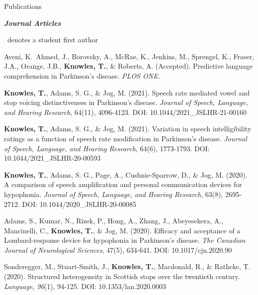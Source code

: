\documentclass{resume} %
\begin{document}

\begin{rSection}{Publications}

\begin{center}
	{\bf \emph{Journal Articles}}
\end{center}

\dagger\ denotes a student first author

\begin{etaremune}

	\item Aveni, K.\dagger\, Ahmed, J., Borovsky, A., McRae, K., Jenkins, M., Sprengel, K., Fraser, J.A., Orange, J.B., {\bf Knowles, T.}, \& Roberts, A. (Accepted). Predictive language comprehension in Parkinson’s disease. \emph{PLOS ONE.}

	\item {\bf Knowles, T.}, Adams, S. G., \& Jog, M. (2021). Speech rate mediated vowel and stop voicing distinctiveness in Parkinson's disease. \emph{Journal of Speech, Language, and Hearing Research}, 64(11), 4096-4123. DOI: 10.1044/2021\_JSLHR-21-00160

	\item {\bf Knowles, T.}, Adams, S. G., \& Jog, M. (2021). Variation in speech intelligibility ratings as a function of speech rate modification in Parkinson's disease. \emph{Journal of Speech, Language, and Hearing Research}, 64(6), 1773-1793. DOI: 10.1044/2021\_JSLHR-20-00593

	\item {\bf Knowles, T.}, Adams, S. G., Page, A., Cushnie-Sparrow, D., \& Jog, M. (2020). A comparison of speech amplification and personal communication devices for hypophonia. \emph{Journal of Speech, Language, and Hearing Research}, 63(8), 2695-2712. DOI: 10.1044/2020\_JSLHR-20-00085
	
	\item Adams, S., Kumar, N., Rizek, P., Hong, A., Zhang, J., Abeyesekera, A., Mancinelli, C., {\bf Knowles, T.}, \& Jog, M. (2020). Efficacy and acceptance of a Lombard-response device for hypophonia in Parkinson’s disease. \emph{The Canadian Journal of Neurological Sciences}, 47(5), 634-641. DOI: 10.1017/cjn.2020.90

	\item Sonderegger, M., Stuart-Smith, J., {\bf Knowles, T.}, Macdonald, R., \& Rathcke, T. (2020). Structured heterogeneity in Scottish stops over the twentieth century. \emph{Language, 96}(1), 94-125. DOI: 10.1353/lan.2020.0003
	

\end{etaremune}
\end{rSection}
\end{document}
